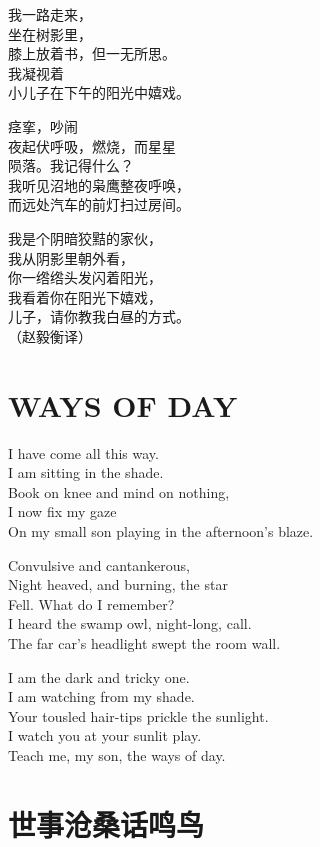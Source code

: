 \documentclass[]{book}
\renewenvironment{quote}{\begin{VF}}{\end{VF}}
\begin{document}
\begin{quote}
我一路走来，\\
坐在树影里，\\
膝上放着书，但一无所思。\\
我凝视着\\
小儿子在下午的阳光中嬉戏。

痉挛，吵闹\\
夜起伏呼吸，燃烧，而星星\\
陨落。我记得什么？\\
我听见沼地的枭鹰整夜呼唤，\\
而远处汽车的前灯扫过房间。

我是个阴暗狡黠的家伙，\\
我从阴影里朝外看，\\
你一绺绺头发闪着阳光，\\
我看着你在阳光下嬉戏，\\
儿子，请你教我白昼的方式。\\
（赵毅衡译）
\end{quote}

\section{WAYS OF DAY}\label{ways-of-day}

\begin{quote}
I have come all this way.\\
I am sitting in the shade.\\
Book on knee and mind on nothing,\\
I now fix my gaze\\
On my small son playing in the afternoon's blaze.

Convulsive and cantankerous,\\
Night heaved, and burning, the star\\
Fell. What do I remember?\\
I heard the swamp owl, night-long, call.\\
The far car's headlight swept the room wall.

I am the dark and tricky one.\\
I am watching from my shade.\\
Your tousled hair-tips prickle the sunlight.\\
I watch you at your sunlit play.\\
Teach me, my son, the ways of day.
\end{quote}

\section{世事沧桑话鸣鸟}
\end{document}

